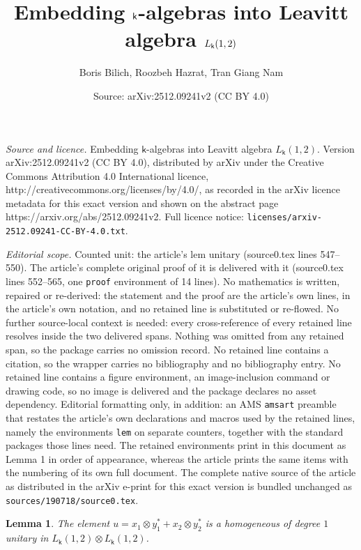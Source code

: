 \documentclass[10pt,a4paper]{amsart}
\title{Embedding $\K$-algebras into Leavitt algebra $L_\K(1, 2)$}
\author{Boris Bilich, Roozbeh Hazrat, Tran Giang Nam}
\date{Source: arXiv:2512.09241v2 (CC BY 4.0)}
\newtheorem{lem}{Lemma}
\newcommand{\K}{\mathsf{k}}
\begin{document}
\maketitle

\noindent\emph{Source and licence.} Embedding $\K$-algebras into Leavitt algebra $L_\K(1, 2)$. Version arXiv:2512.09241v2 (CC BY 4.0), distributed by arXiv under the Creative Commons Attribution 4.0 International licence, http://creativecommons.org/licenses/by/4.0/, as recorded in the arXiv licence metadata for this exact version and shown on the abstract page https://arxiv.org/abs/2512.09241v2. Full licence notice: \texttt{licenses/arxiv-2512.09241-CC-BY-4.0.txt}.\par\smallskip

\noindent\textit{Editorial scope.} Counted unit: the article's lem unitary (source0.tex lines 547--550). The article's complete original proof of it is delivered with it (source0.tex lines 552--565, one \texttt{proof} environment of 14 lines). No mathematics is written, repaired or re-derived: the statement and the proof are the article's own lines, in the article's own notation, and no retained line is substituted or re-flowed.  No further source-local context is needed: every cross-reference of every retained line resolves inside the two delivered spans.  Nothing was omitted from any retained span, so the package carries no omission record.  No retained line contains a citation, so the wrapper carries no bibliography and no bibliography entry.  No retained line contains a figure environment, an image-inclusion command or drawing code, so no image is delivered and the package declares no asset dependency.  Editorial formatting only, in addition: an AMS \texttt{amsart} preamble that restates the article's own declarations and macros used by the retained lines, namely the environments \texttt{lem} on separate counters, together with the standard packages those lines need.  The retained environments print in this document as Lemma 1 in order of appearance, whereas the article prints the same items with the numbering of its own full document.  The complete native source of the article as distributed in the arXiv e-print for this exact version is bundled unchanged as \texttt{sources/190718/source0.tex}.
\begin{lem}\label{unitary}
The element $ u = x_1 \otimes y_1^* + x_2 \otimes y_2^*$
is a homogeneous of degree $1$ unitary in $L_\K(1,2)\otimes L_\K(1,2)$.
\end{lem}
\end{document}
